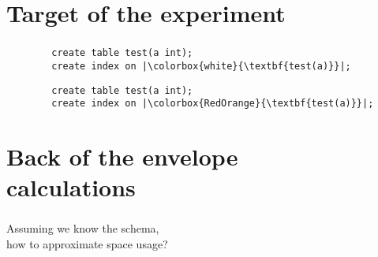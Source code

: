 \documentclass[usenames,dvipsnames, 18pt, compress, aspectratio=169]{beamer}
\begin{document}
\section{Target of the experiment}

\begin{frame}[fragile]{}
    \frametitle{}

    \begin{overprint}[\textwidth]
        \begin{verbatim}
        create table test(a int);
        create index on |\colorbox{white}{\textbf{test(a)}}|;
        \end{verbatim}

        \begin{verbatim}
        create table test(a int);
        create index on |\colorbox{RedOrange}{\textbf{test(a)}}|;
        \end{verbatim}
    \end{overprint}

\end{frame}

\section{Back of the envelope\\ calculations}





\begin{frame}[fragile]{}
    \frametitle{}

    Assuming we know the schema,\\
    how to approximate space usage?
\end{frame}
\end{document}
